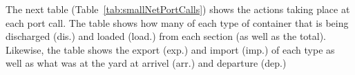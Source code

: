 
The next table (Table~\ref{tab:smallNetPortCalls}) shows the actions taking place at each port call. The table shows how many of each type of container that is being discharged (dis.) and loaded (load.) from each section (as well as the total). Likewise, the table shows the export (exp.) and import (imp.) of each type as well as what was at the yard at arrivel (arr.) and departure (dep.)

